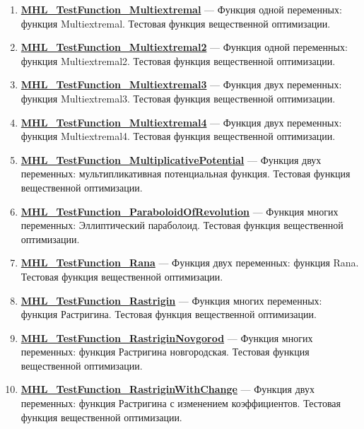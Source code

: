 \documentclass[a4paper,12pt]{article}
\begin{document}
\begin{enumerate}
\item \textbf{\hyperref[MHL_TestFunction_Multiextremal]{MHL\_TestFunction\_Multiextremal}} --- Функция одной переменных: функция Multiextremal. Тестовая функция вещественной оптимизации.

\item \textbf{\hyperref[MHL_TestFunction_Multiextremal2]{MHL\_TestFunction\_Multiextremal2}} --- Функция одной переменных: функция Multiextremal2. Тестовая функция вещественной оптимизации.

\item \textbf{\hyperref[MHL_TestFunction_Multiextremal3]{MHL\_TestFunction\_Multiextremal3}} --- Функция двух переменных: функция Multiextremal3. Тестовая функция вещественной оптимизации.

\item \textbf{\hyperref[MHL_TestFunction_Multiextremal4]{MHL\_TestFunction\_Multiextremal4}} --- Функция двух переменных: функция Multiextremal4. Тестовая функция вещественной оптимизации.

\item \textbf{\hyperref[MHL_TestFunction_MultiplicativePotential]{MHL\_TestFunction\_MultiplicativePotential}} --- Функция двух переменных: мультипликативная потенциальная функция. Тестовая функция вещественной оптимизации.

\item \textbf{\hyperref[MHL_TestFunction_ParaboloidOfRevolution]{MHL\_TestFunction\_ParaboloidOfRevolution}} --- Функция многих переменных: Эллиптический параболоид. Тестовая функция вещественной оптимизации.

\item \textbf{\hyperref[MHL_TestFunction_Rana]{MHL\_TestFunction\_Rana}} --- Функция двух переменных: функция Rana. Тестовая функция вещественной оптимизации.

\item \textbf{\hyperref[MHL_TestFunction_Rastrigin]{MHL\_TestFunction\_Rastrigin}} --- Функция многих переменных: функция Растригина. Тестовая функция вещественной оптимизации.

\item \textbf{\hyperref[MHL_TestFunction_RastriginNovgorod]{MHL\_TestFunction\_RastriginNovgorod}} --- Функция многих переменных: функция Растригина новгородская. Тестовая функция вещественной оптимизации.

\item \textbf{\hyperref[MHL_TestFunction_RastriginWithChange]{MHL\_TestFunction\_RastriginWithChange}} --- Функция двух переменных: функция Растригина с изменением коэффициентов. Тестовая функция вещественной оптимизации.


\end{enumerate}
\end{document}
